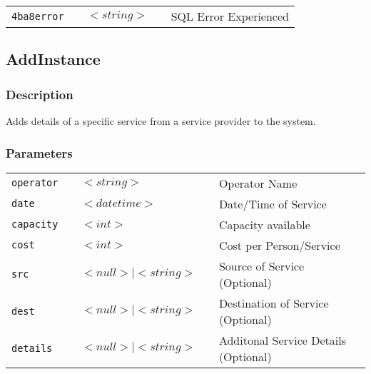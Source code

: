 \begin{tabular}{lllll}
\verb!4ba8error! & \hspace{15mm} & $<string>$ & \hspace{15mm} & SQL Error Experienced \\
\end{tabular}


\subsection{AddInstance}

\subsubsection{Description}

Adds details of a specific service from a service provider to the
system.  

\subsubsection{Parameters}

\begin{tabular}{lllll}
\verb!operator! & \hspace{15mm} & $<string>$ 	& \hspace{15mm} & Operator Name \\
\verb!date! 	 & \hspace{15mm} & $<datetime>$ & \hspace{15mm} & Date/Time of Service\\
\verb!capacity! & \hspace{15mm} & $<int>$ 		& \hspace{15mm} & Capacity available \\
\verb!cost! 	 & \hspace{15mm} & $<int>$ 		& \hspace{15mm} & Cost per Person/Service \\
\verb!src! 		 & \hspace{15mm} & $<null> \mid <string>$ & \hspace{15mm} & Source of Service (Optional) \\
\verb!dest! 	 & \hspace{15mm} & $<null> \mid <string>$ & \hspace{15mm} & Destination of Service (Optional) \\
\verb!details!  & \hspace{15mm} & $<null> \mid <string>$ & \hspace{15mm} & Additonal Service Details (Optional) \\
\end{tabular}


